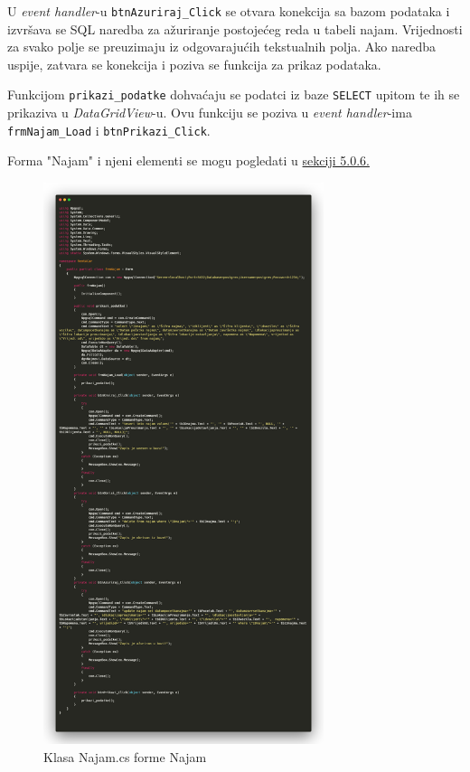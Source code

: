 \documentclass[]{foi}
\begin{document}
U \textit{event handler}-u \texttt{btnAzuriraj\_Click} se otvara konekcija sa bazom podataka i izvršava se SQL naredba za ažuriranje postojećeg reda u tabeli najam. Vrijednosti za svako polje se preuzimaju iz odgovarajućih tekstualnih polja. Ako naredba uspije, zatvara se konekcija i poziva se funkcija za prikaz podataka.

Funkcijom \texttt{prikazi\_podatke} dohvaćaju se podatci iz baze \texttt{SELECT} upitom te ih se prikaziva u \textit{DataGridView}-u. Ovu funkciju se poziva u \textit{event handler}-ima \texttt{frmNajam\_Load} i \texttt{btnPrikazi\_Click}.

Forma "Najam" i njeni elementi se mogu pogledati u \hyperref[sec:najam]{sekciji 5.0.6.}
\newpage

\begin{figure}[!ht]
    \centering
    \includegraphics[width=0.73\textwidth]{slike/klasa.png}
    \caption{Klasa Najam.cs forme Najam}
    \label{fig:klasa}
\end{figure}
\newpage
\end{document}
